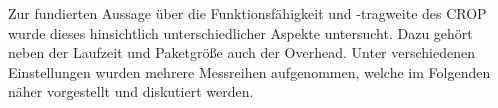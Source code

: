 \label{cap:protokollAnalyse}
Zur fundierten Aussage über die Funktionsfähigkeit und -tragweite des CROP wurde
dieses hinsichtlich unterschiedlicher Aspekte untersucht. Dazu gehört neben der
Laufzeit und Paketgröße auch der Overhead. Unter verschiedenen Einstellungen
wurden mehrere Messreihen aufgenommen, welche im Folgenden näher vorgestellt und
diskutiert werden.
